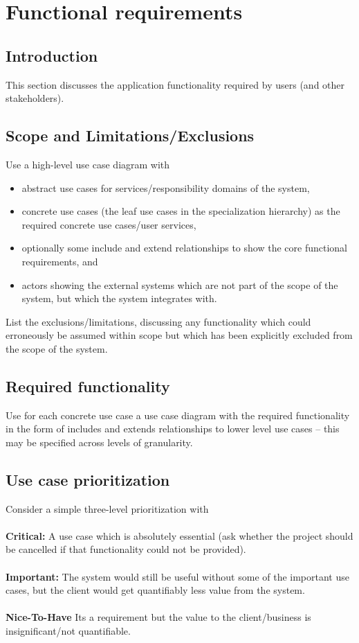 \documentclass[11pt,a4paper]{article}
\begin{document}
\section{Functional requirements}
\subsection{Introduction}
This section discusses the application functionality required by users (and other stakeholders).
\subsection{Scope and Limitations/Exclusions}
Use a high-level use case diagram with
\begin{itemize}
\item abstract use cases for services/responsibility domains of the system,
\item concrete use cases (the leaf use cases in the specialization hierarchy) as the required concrete use cases/user services,
\item optionally some include and extend relationships to show the core functional requirements, and
\item actors showing the external systems which are not part of the scope of the system, but which
the system integrates with.
\end{itemize}
List the exclusions/limitations, discussing any functionality which could erroneously be assumed within scope but which has been explicitly excluded from the scope of the system.
\subsection{Required functionality}
Use for each concrete use case a use case diagram with the required functionality in the form of includes and extends relationships to lower level use cases – this may be specified across levels of granularity.
\subsection{Use case prioritization}
Consider a simple three-level prioritization with
\\\\
\textbf{Critical: }A use case which is absolutely essential (ask whether the project should be cancelled if that functionality could not be provided).
\\\\
\textbf{Important: } The system would still be useful without some of the important use cases, but the client would get quantifiably less value from the system.
\\\\
\textbf{Nice-To-Have} Its a requirement but the value to the client/business is insignificant/not quantifiable.
\end{document}
